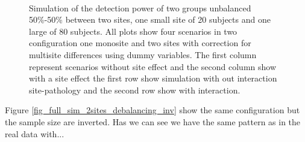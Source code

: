 \documentclass[authoryear]{elsarticle}
\begin{document}
\begin{figure}[tbp]
     \\
     \caption{
     Simulation of the detection power of two groups unbalanced 50\%-50\% between two sites, one small site of 20 subjects and one large of 80 subjects. All plots show four scenarios in two configuration one monosite and two sites with correction for multisite differences using dummy variables. The first column represent scenarios without site effect and the second column show with a site effect the first row show simulation with out interaction site-pathology and the second row show with interaction.
}
\label{fig_full_sim_2sites_balanced}
\end{figure}
 
Figure \ref{fig_full_sim_2sites_debalancing_inv} show the same configuration but the sample size are inverted. Has we can see we have the same pattern as in the real data with...
\end{document}
